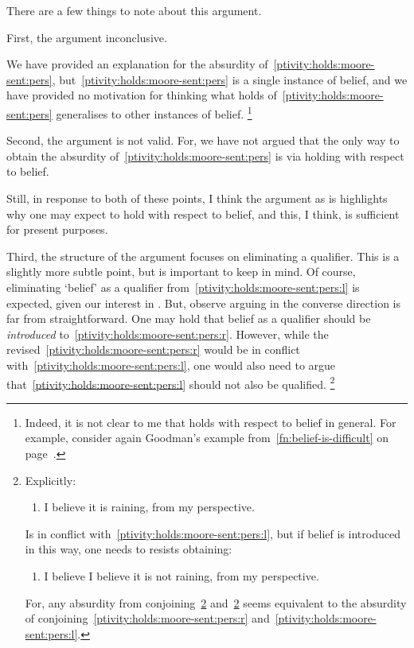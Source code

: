 \begin{note}
  There are a few things to note about this argument.

  First, the argument inconclusive.

  We have provided an explanation for the absurdity of~\ref{ptivity:holds:moore-sent:pers}, but~\ref{ptivity:holds:moore-sent:pers} is a single instance of belief, and we have provided no motivation for thinking what holds of~\ref{ptivity:holds:moore-sent:pers} generalises to other instances of belief.%
  \footnote{
    Indeed, it is not clear to me that \ptivity{} holds with respect to belief in general.
    For example, consider again Goodman's example from~\autoref{fn:belief-is-difficult} on page~\pageref{fn:belief-is-difficult}.
  }

  Second, the argument is not valid.
  For, we have not argued that the only way to obtain the absurdity of~\ref{ptivity:holds:moore-sent:pers} is via \ptivity{} holding with respect to belief.

  Still, in response to both of these points, I think the argument as is highlights why one may expect \ptivity{} to hold with respect to belief, and this, I think, is sufficient for present purposes.

  Third, the structure of the argument focuses on eliminating a qualifier.
  This is a slightly more subtle point, but is important to keep in mind.
  Of course, eliminating `belief' as a qualifier from~\ref{ptivity:holds:moore-sent:pers:l} is expected, given our interest in \ptivity{}.
  But, observe arguing in the converse direction is far from straightforward.
  One may hold that belief as a qualifier should be \emph{introduced} to~\ref{ptivity:holds:moore-sent:pers:r}.
  However, while the revised~\ref{ptivity:holds:moore-sent:pers:r} would be in conflict with~\ref{ptivity:holds:moore-sent:pers:l}, one would also need to argue that~\ref{ptivity:holds:moore-sent:pers:l} should not also be qualified.%
  \footnote{
    Explicitly:
    \begin{enumerate}[label=\emph{M\('\)\textsubscript{r+}}., ref=(\emph{M\('\)\textsubscript{r+}})]
    \item
      \label{ptivity:holds:moore-sent:pers:rq}
      I believe it is raining, from my perspective.
    \end{enumerate}
    Is in conflict with~\ref{ptivity:holds:moore-sent:pers:l}, but if belief is introduced in this way, one needs to resists obtaining:
    \begin{enumerate}[label=\emph{M\('\)\textsubscript{l+}}., ref=(\emph{M\('\)\textsubscript{l+}})]
    \item
      \label{ptivity:holds:moore-sent:pers:lq}
      I believe I believe it is not raining, from my perspective.
    \end{enumerate}
    For, any absurdity from conjoining~\ref{ptivity:holds:moore-sent:pers:rq} and~\ref{ptivity:holds:moore-sent:pers:lq} seems equivalent to the absurdity of conjoining~\ref{ptivity:holds:moore-sent:pers:r} and~\ref{ptivity:holds:moore-sent:pers:l}.

}
\end{note}
